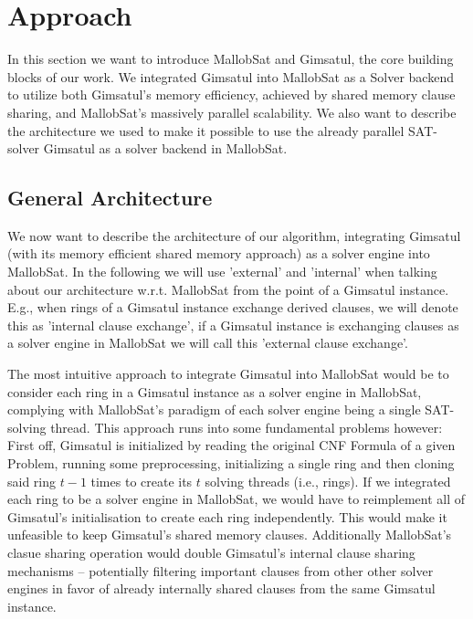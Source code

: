 \documentclass[12pt,a4paper,twoside]{scrartcl}
\numberwithin{equation}{section}
\begin{document}

\section{Approach}

In this section we want to introduce MallobSat and Gimsatul, the core building blocks of our work. We integrated Gimsatul into MallobSat as a Solver backend to utilize both Gimsatul's memory efficiency, achieved by shared memory clause sharing, and MallobSat's massively parallel scalability. We also want to describe the architecture we used to make it possible to use the already parallel SAT-solver Gimsatul as a solver backend in MallobSat.

\subsection{General Architecture}

We now want to describe the architecture of our algorithm, integrating Gimsatul (with its memory efficient shared memory approach) as a solver engine into MallobSat. In the following we will use 'external' and 'internal' when talking about our architecture w.r.t. MallobSat from the point of a Gimsatul instance. E.g., when rings of a Gimsatul instance exchange derived clauses, we will denote this as 'internal clause exchange', if a Gimsatul instance is exchanging clauses as a solver engine in MallobSat we will call this 'external clause exchange'.

The most intuitive approach to integrate Gimsatul into MallobSat would be to consider each ring in a Gimsatul instance as a solver engine in MallobSat, complying with MallobSat's paradigm of each solver engine being a single SAT-solving thread. This approach runs into some fundamental problems however: 
First off, Gimsatul is initialized by reading the original CNF Formula of a given Problem, running some preprocessing, initializing a single ring and then cloning said ring $t - 1$ times to create its $t$ solving threads (i.e., rings). If we integrated each ring to be a solver engine in MallobSat, we would have to reimplement all of Gimsatul's initialisation to create each ring independently. This would make it unfeasible to keep Gimsatul's shared memory clauses. Additionally MallobSat's clasue sharing operation would double Gimsatul's internal clause sharing mechanisms -- potentially filtering important clauses from other other solver engines in favor of already internally shared clauses from the same Gimsatul instance.
\end{document}
